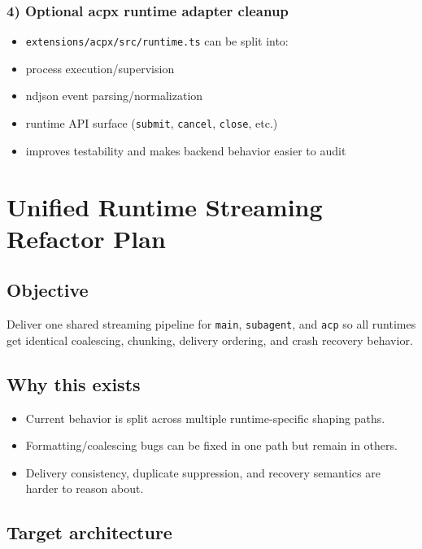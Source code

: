 \subsubsection{4) Optional acpx runtime adapter cleanup}


\begin{itemize}
  \item \texttt{extensions/acpx/src/runtime.ts} can be split into:
  \item process execution/supervision
  \item ndjson event parsing/normalization
  \item runtime API surface (\texttt{submit}, \texttt{cancel}, \texttt{close}, etc.)
  \item improves testability and makes backend behavior easier to audit
\end{itemize}



\clearpage

\section{Unified Runtime Streaming Refactor Plan}


\subsection{Objective}


Deliver one shared streaming pipeline for \texttt{main}, \texttt{subagent}, and \texttt{acp} so all runtimes get identical coalescing, chunking, delivery ordering, and crash recovery behavior.

\subsection{Why this exists}


\begin{itemize}
  \item Current behavior is split across multiple runtime-specific shaping paths.
  \item Formatting/coalescing bugs can be fixed in one path but remain in others.
  \item Delivery consistency, duplicate suppression, and recovery semantics are harder to reason about.
\end{itemize}


\subsection{Target architecture}


